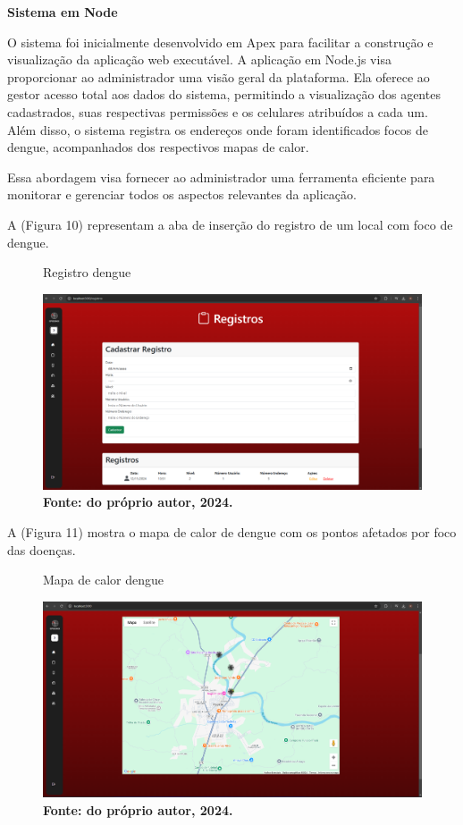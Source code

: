 \vspace{12pt}

\textbf{Sistema em Node}\newline

O sistema foi inicialmente desenvolvido em Apex para facilitar a construção e visualização da aplicação web executável. A aplicação em Node.js visa proporcionar ao administrador uma visão geral da plataforma. Ela oferece ao gestor acesso total aos dados do sistema, permitindo a visualização dos agentes cadastrados, suas respectivas permissões e os celulares atribuídos a cada um. Além disso, o sistema registra os endereços onde foram identificados focos de dengue, acompanhados dos respectivos mapas de calor.

Essa abordagem visa fornecer ao administrador uma ferramenta eficiente para monitorar e gerenciar todos os aspectos relevantes da aplicação.

\vspace{12pt}

A (Figura 10) representam a aba de inserção do registro de um local com foco de dengue.

\begin{figure}[H]
    \centering
    \caption{Registro dengue}
    \includegraphics[width=1.0\linewidth]{Illustrations/Registro_Epidemix.png}
    \caption*{\textbf{Fonte: do próprio autor, 2024.}}
\end{figure}

\vspace{12pt}

A (Figura 11) mostra o mapa de calor de dengue com os pontos afetados por foco das doenças. 

\begin{figure}[H]
    \centering
    \caption{Mapa de calor dengue}
    \includegraphics[width=1.0\linewidth]{Illustrations/Mapa de Calor.png}
    \caption*{\textbf{Fonte: do próprio autor, 2024.}}
\end{figure}

